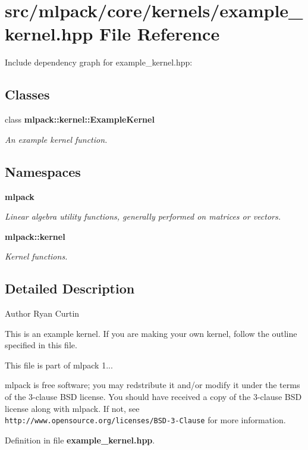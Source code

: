 \section{src/mlpack/core/kernels/example\-\_\-kernel.hpp File Reference}
\label{example__kernel_8hpp}
Include dependency graph for example\-\_\-kernel.\-hpp\-:
\subsection*{Classes}
\begin{DoxyCompactItemize}
\item 
class {\bf mlpack\-::kernel\-::\-Example\-Kernel}
\begin{DoxyCompactList}\small\item\em An example kernel function. \end{DoxyCompactList}\end{DoxyCompactItemize}
\subsection*{Namespaces}
\begin{DoxyCompactItemize}
\item 
{\bf mlpack}
\begin{DoxyCompactList}\small\item\em Linear algebra utility functions, generally performed on matrices or vectors. \end{DoxyCompactList}\item 
{\bf mlpack\-::kernel}
\begin{DoxyCompactList}\small\item\em Kernel functions. \end{DoxyCompactList}\end{DoxyCompactItemize}


\subsection{Detailed Description}
\begin{DoxyAuthor}{Author}
Ryan Curtin
\end{DoxyAuthor}
This is an example kernel. If you are making your own kernel, follow the outline specified in this file.

This file is part of mlpack 1...

mlpack is free software; you may redstribute it and/or modify it under the terms of the 3-\/clause B\-S\-D license. You should have received a copy of the 3-\/clause B\-S\-D license along with mlpack. If not, see {\tt http\-://www.\-opensource.\-org/licenses/\-B\-S\-D-\/3-\/\-Clause} for more information. 

Definition in file {\bf example\-\_\-kernel.\-hpp}.

